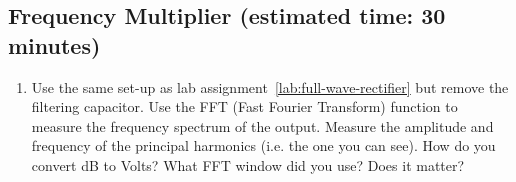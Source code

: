 \documentclass{article}
\begin{document}
\subsection{Frequency Multiplier (estimated time: 30 minutes)}
\begin{enumerate}
\item Use the same set-up as lab assignment~\ref{lab:full-wave-rectifier} but remove the filtering capacitor.  Use the FFT (Fast Fourier Transform) function to measure the frequency spectrum of the output. Measure the amplitude and frequency of the principal harmonics (i.e. the one you can see). How do you convert dB to Volts? What FFT window did you use? Does it matter?
\end{enumerate}
\end{document}
